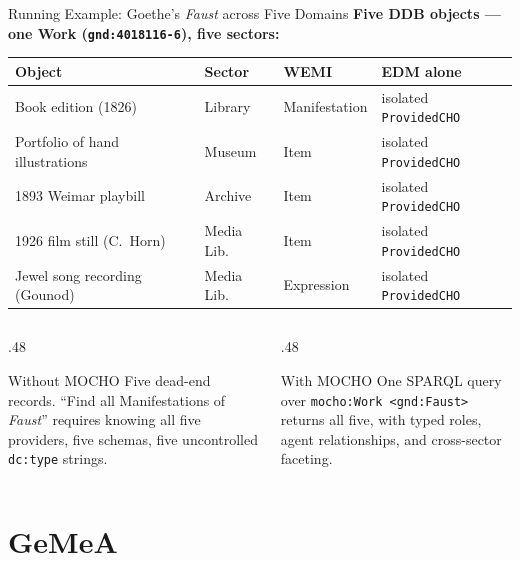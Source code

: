 \documentclass[xcolor,aspectratio=169,compress]{beamer}
\begin{document}

\begin{frame}{Running Example: Goethe's \textit{Faust} across Five Domains}
  \small
  \textbf{Five DDB objects --- one Work (\texttt{gnd:4018116-6}), five sectors:}
  \medskip
  \begin{center}
  \begin{tabular}{llll}
    \toprule
    Object & Sector & WEMI & EDM alone \\
    \midrule
    Book edition (1826)            & Library    & Manifestation & isolated \texttt{ProvidedCHO} \\
    Portfolio of hand illustrations & Museum     & Item          & isolated \texttt{ProvidedCHO} \\
    1893 Weimar playbill            & Archive    & Item          & isolated \texttt{ProvidedCHO} \\
    1926 film still (C.\ Horn)     & Media Lib. & Item          & isolated \texttt{ProvidedCHO} \\
    Jewel song recording (Gounod)  & Media Lib. & Expression    & isolated \texttt{ProvidedCHO} \\
    \bottomrule
  \end{tabular}
  \end{center}
  \medskip
  \begin{columns}
    \begin{column}{.48\textwidth}
      \begin{block}{Without MOCHO}
        Five dead-end records.
        ``Find all Manifestations of \textit{Faust}'' requires knowing all five
        providers, five schemas, five uncontrolled \texttt{dc:type} strings.
      \end{block}
    \end{column}
    \begin{column}{.48\textwidth}
      \begin{exampleblock}{With MOCHO}
        One SPARQL query over \texttt{mocho:Work <gnd:Faust>} returns all five,
        with typed roles, agent relationships, and cross-sector faceting.
      \end{exampleblock}
    \end{column}
  \end{columns}
\end{frame}

\section{GeMeA}
\end{document}
